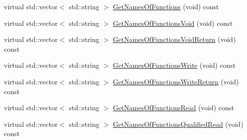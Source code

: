 {\bf }\par
\begin{DoxyCompactItemize}
\item 
virtual std\+::vector$<$ std\+::string $>$ \hyperlink{classmts_interface_required_ab754a787c59ec469d69833bdbf6d1399}{Get\+Names\+Of\+Functions} (void) const 
\item 
virtual std\+::vector$<$ std\+::string $>$ \hyperlink{classmts_interface_required_a197e2980d3cf58141ef369b6f866a661}{Get\+Names\+Of\+Functions\+Void} (void) const 
\item 
virtual std\+::vector$<$ std\+::string $>$ \hyperlink{classmts_interface_required_a9858da8cb7928f85f237e044ce23901d}{Get\+Names\+Of\+Functions\+Void\+Return} (void) const 
\item 
virtual std\+::vector$<$ std\+::string $>$ \hyperlink{classmts_interface_required_af8789b5b4db6e6acad15b2598238808c}{Get\+Names\+Of\+Functions\+Write} (void) const 
\item 
virtual std\+::vector$<$ std\+::string $>$ \hyperlink{classmts_interface_required_a8bd333d2df5727af6e8ba28a407865ad}{Get\+Names\+Of\+Functions\+Write\+Return} (void) const 
\item 
virtual std\+::vector$<$ std\+::string $>$ \hyperlink{classmts_interface_required_ae51957b52fbe757e0750ed406bb064b3}{Get\+Names\+Of\+Functions\+Read} (void) const 
\item 
virtual std\+::vector$<$ std\+::string $>$ \hyperlink{classmts_interface_required_af0f9ccff5325f10d325910afa4f45411}{Get\+Names\+Of\+Functions\+Qualified\+Read} (void) const 
\end{DoxyCompactItemize}

